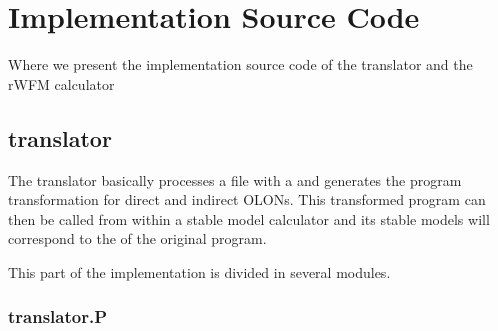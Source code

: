 \chapter{Implementation Source Code}

\begin{ChapAbstract}
Where we present the implementation source code of the \gro translator and the rWFM calculator
\end{ChapAbstract}

\section{\gro translator}
The \gro translator basically processes a file with a \nlp and generates the program transformation for direct and indirect OLONs. This transformed program can then be called from within a stable model calculator and its stable models will correspond to the \rsms of the original program.

This part of the implementation is divided in several modules.
\subsection{translator.P}

